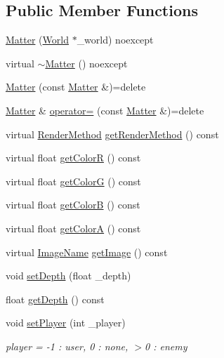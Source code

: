 \subsection*{Public Member Functions}
\begin{DoxyCompactItemize}
\item 
\hyperlink{classMatter_a7553dd6bd2e7863c2fd59c388916a87b}{Matter} (\hyperlink{classWorld}{World} $\ast$\+\_\+world) noexcept
\item 
virtual \hyperlink{classMatter_a2087311945c6e5fe470bf404f85e4bde}{$\sim$\+Matter} () noexcept
\item 
\hyperlink{classMatter_ae3afe6f6b9571ee1e2fe401a90d5c407}{Matter} (const \hyperlink{classMatter}{Matter} \&)=delete
\item 
\hyperlink{classMatter}{Matter} \& \hyperlink{classMatter_a3e44ded88dc43c882843ccaf6ceaeda0}{operator=} (const \hyperlink{classMatter}{Matter} \&)=delete
\item 
virtual \hyperlink{classMatter_ade1ce1bf81f25377f689d103cd431907}{Render\+Method} \hyperlink{classMatter_a3d6823a375fe0a537837b905b44af5bd}{get\+Render\+Method} () const 
\item 
virtual float \hyperlink{classMatter_a926d246584228c3e3b102dbfd42036ec}{get\+Color\+R} () const 
\item 
virtual float \hyperlink{classMatter_aa3fcdc82f788fbf873ec3ff4808f614a}{get\+Color\+G} () const 
\item 
virtual float \hyperlink{classMatter_af830da17da427c84c7f6deee4a91b3d4}{get\+Color\+B} () const 
\item 
virtual float \hyperlink{classMatter_aa44ee7ba48cb9a582a6f86e1e9e2ef38}{get\+Color\+A} () const 
\item 
virtual \hyperlink{image_8h_af9361b398b5cfcafbe93f82e8eaeb080}{Image\+Name} \hyperlink{classMatter_ad6202a62e4ae27dde457c56520f1865e}{get\+Image} () const 
\item 
void \hyperlink{classMatter_a678834a886a610754ea863751fb6c046}{set\+Depth} (float \+\_\+depth)
\item 
float \hyperlink{classMatter_aa0f6ed46b01aac5f7404635cbba56c3e}{get\+Depth} () const 
\item 
void \hyperlink{classMatter_a3e7f9e8ade54d7c5fbb82da57f5b0ff8}{set\+Player} (int \+\_\+player)
\begin{DoxyCompactList}\small\item\em player = -\/1 \+: user, 0 \+: none, $>$0 \+: enemy \end{DoxyCompactList}\item 

\end{DoxyCompactItemize}
